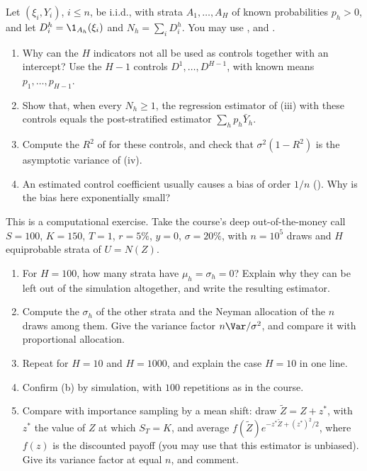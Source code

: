 \begin{exercise}\label{ex:st-post-regression}
\medium Let $(\xi_i,Y_i)$, $i\le n$, be i.i.d., with strata $A_1,\dots,A_H$ of known
probabilities $p_h>0$, and let $D^h_i=\1_{A_h}(\xi_i)$ and $N_h=\sum_iD^h_i$. You may use
,  and .
\begin{enumerate}[label=(\alph*)]
  \item Why can the $H$ indicators not all be used as controls together with an intercept?
    Use the $H-1$ controls $D^1,\dots,D^{H-1}$, with known means $p_1,\dots,p_{H-1}$.
  \item Show that, when every $N_h\ge1$, the regression estimator of
    (iii) with these controls equals the post-stratified estimator
    $\sum_hp_h\bar Y_h$.
  \item Compute the $R^2$ of  for these controls, and check that
    $\sigma^2(1-R^2)$ is the asymptotic variance of (iv).
  \item An estimated control coefficient usually causes a bias of order $1/n$
    (). Why is the bias here exponentially small?
\end{enumerate}
\end{exercise}

\begin{exercise}\label{ex:st-neyman-otm}
\medium This is a computational exercise. Take the course's deep out-of-the-money call
$S=100$, $K=150$, $T=1$, $r=5\%$, $y=0$, $\sigma=20\%$, with $n=10^5$ draws and $H$
equiprobable strata of $U=N(Z)$.
\begin{enumerate}[label=(\alph*)]
  \item For $H=100$, how many strata have $\mu_h=\sigma_h=0$? Explain why they can be left out
    of the simulation altogether, and write the resulting estimator.
  \item Compute the $\sigma_h$ of the other strata and the Neyman allocation of the $n$ draws
    among them. Give the variance factor $n\Var/\sigma^2$, and compare it with proportional
    allocation.
  \item Repeat for $H=10$ and $H=1000$, and explain the case $H=10$ in one line.
  \item Confirm (b) by simulation, with $100$ repetitions as in the course.
  \item Compare with importance sampling by a mean shift: draw $\tilde Z=Z+z^*$, with $z^*$ the
    value of $Z$ at which $S_T=K$, and average $f(\tilde Z)e^{-z^*\tilde Z+(z^*)^2/2}$, where
    $f(z)$ is the discounted payoff (you may use that this estimator is unbiased). Give its
    variance factor at equal $n$, and comment.
\end{enumerate}
\end{exercise}

